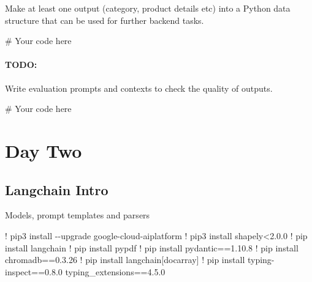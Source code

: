 \documentclass[
  letterpaper,
  DIV=11,
  numbers=noendperiod]{scrreprt}
\newenvironment{Shaded}{\begin{snugshade}}{\end{snugshade}}
\newcommand{\CommentTok}[1]{\textcolor[rgb]{0.37,0.37,0.37}{#1}}
\newcommand{\FloatTok}[1]{\textcolor[rgb]{0.68,0.00,0.00}{#1}}
\newcommand{\NormalTok}[1]{\textcolor[rgb]{0.00,0.23,0.31}{#1}}
\newcommand{\OperatorTok}[1]{\textcolor[rgb]{0.37,0.37,0.37}{#1}}
\begin{document}
Make at least one output (category, product details etc) into a Python
data structure that can be used for further backend tasks.

\begin{Shaded}
\begin{Highlighting}[]
\CommentTok{\# Your code here}
\end{Highlighting}
\end{Shaded}

\hypertarget{todo-2}{%
\subsection{TODO:}\label{todo-2}}

Write evaluation prompts and contexts to check the quality of outputs.

\begin{Shaded}
\begin{Highlighting}[]
\CommentTok{\# Your code here}
\end{Highlighting}
\end{Shaded}

\part{Day Two}

\hypertarget{langchain-intro}{%
\chapter{Langchain Intro}\label{langchain-intro}}

Models, prompt templates and parsers

\begin{Shaded}
\begin{Highlighting}[]
\OperatorTok{!}\NormalTok{ pip3 install }\OperatorTok{{-}{-}}\NormalTok{upgrade google}\OperatorTok{{-}}\NormalTok{cloud}\OperatorTok{{-}}\NormalTok{aiplatform}
\OperatorTok{!}\NormalTok{ pip3 install shapely}\OperatorTok{\textless{}}\FloatTok{2.0.0}
\OperatorTok{!}\NormalTok{ pip install langchain}
\OperatorTok{!}\NormalTok{ pip install pypdf}
\OperatorTok{!}\NormalTok{ pip install pydantic}\OperatorTok{==}\FloatTok{1.10.8}
\OperatorTok{!}\NormalTok{ pip install chromadb}\OperatorTok{==}\FloatTok{0.3.26}
\OperatorTok{!}\NormalTok{ pip install langchain[docarray]}
\OperatorTok{!}\NormalTok{ pip install typing}\OperatorTok{{-}}\NormalTok{inspect}\OperatorTok{==}\FloatTok{0.8.0}\NormalTok{ typing\_extensions}\OperatorTok{==}\FloatTok{4.5.0}
\end{Highlighting}
\end{Shaded}
\end{document}
